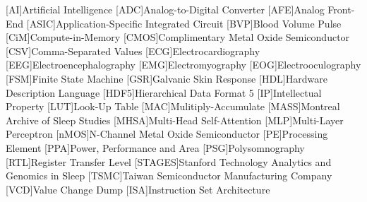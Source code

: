 \begin{acronym}
    {\small{}
    [AI]{Artificial Intelligence}
    [ADC]{Analog-to-Digital Converter}
    [AFE]{Analog Front-End}
    [ASIC]{Application-Specific Integrated Circuit}
    [BVP]{Blood Volume Pulse}
    [CiM]{Compute-in-Memory}
    [CMOS]{Complimentary Metal Oxide Semiconductor}
    [CSV]{Comma-Separated Values}
    [ECG]{Electrocardiography}
    [EEG]{Electroencephalography}
    [EMG]{Electromyography}
    [EOG]{Electrooculography}
    [FSM]{Finite State Machine}
    [GSR]{Galvanic Skin Response}
    [HDL]{Hardware Description Language}
    [HDF5]{Hierarchical Data Format 5}
    [IP]{Intellectual Property}
    [LUT]{Look-Up Table}
    [MAC]{Mulitiply-Accumulate}
    [MASS]{Montreal Archive of Sleep Studies}
    [MHSA]{Multi-Head Self-Attention}
    [MLP]{Multi-Layer Perceptron}
    [nMOS]{N-Channel Metal Oxide Semiconductor}
    [PE]{Processing Element}
    [PPA]{Power, Performance and Area}
    [PSG]{Polysomnography}
    [RTL]{Register Transfer Level}
    [STAGES]{Stanford Technology Analytics and Genomics in Sleep}
    [TSMC]{Taiwan Semiconductor Manufacturing Company}
    [VCD]{Value Change Dump}
    [ISA]{Instruction Set Architecture}
    }
\end{acronym}